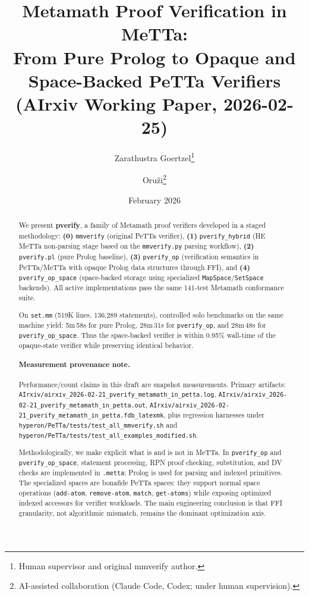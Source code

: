\documentclass[11pt]{article}
\title{Metamath Proof Verification in MeTTa:\\
From Pure Prolog to Opaque and Space-Backed PeTTa Verifiers\\[6pt]
\large (AIrxiv Working Paper, 2026-02-25)}
\author{
  Zarathustra Goertzel\thanks{Human supervisor and original mmverify author.}
  \and
  Oru\v{z}i\thanks{AI-assisted collaboration
    (Claude Code, Codex; under human supervision).}
}
\date{February 2026}
\begin{document}
\maketitle

\begin{abstract}
We present \textbf{pverify}, a family of Metamath proof verifiers
developed in a staged methodology:
\textbf{(0)} \texttt{mmverify} (original PeTTa verifier),
\textbf{(1)} \texttt{pverify\_hybrid}
(HE MeTTa non-parsing stage based on the
\texttt{mmverify.py} parsing workflow),
\textbf{(2)} \texttt{pverify.pl} (pure Prolog baseline),
\textbf{(3)} \texttt{pverify\_op}
(verification semantics in PeTTa/MeTTa with opaque Prolog data
structures through FFI),
and \textbf{(4)} \texttt{pverify\_op\_space}
(space-backed storage using specialized
\texttt{MapSpace}/\texttt{SetSpace} backends).
All active implementations pass the same 141-test Metamath
conformance suite.

On \texttt{set.mm} (519K lines, 136{,}289 statements), controlled
solo benchmarks on the same machine yield:
5m\,58s for pure Prolog,
28m\,31s for \texttt{pverify\_op},
and 28m\,48s for \texttt{pverify\_op\_space}.
Thus the space-backed verifier is within 0.95\% wall-time of the
opaque-state verifier while preserving identical behavior.

\paragraph{Measurement provenance note.}
Performance/count claims in this draft are snapshot measurements. Primary artifacts:
\texttt{AIrxiv/airxiv\_2026-02-21\_pverify\_metamath\_in\_petta.log},
\texttt{AIrxiv/airxiv\_2026-02-21\_pverify\_metamath\_in\_petta.out},
\texttt{AIrxiv/airxiv\_2026-02-21\_pverify\_metamath\_in\_petta.fdb\_latexmk},
plus regression harnesses under
\texttt{hyperon/PeTTa/tests/test\_all\_mmverify.sh} and
\texttt{hyperon/PeTTa/tests/test\_all\_examples\_modified.sh}.

Methodologically, we make explicit what is and is not in MeTTa.
In \texttt{pverify\_op} and \texttt{pverify\_op\_space},
statement processing, RPN proof checking, substitution, and DV checks
are implemented in \texttt{.metta}; Prolog is used for parsing and
indexed primitives.
The specialized spaces are bonafide PeTTa spaces:
they support normal space operations
(\texttt{add-atom}, \texttt{remove-atom}, \texttt{match},
\texttt{get-atoms}) while exposing optimized indexed accessors for
verifier workloads.
The main engineering conclusion is that FFI granularity, not
algorithmic mismatch, remains the dominant optimization axis.
\end{abstract}
\end{document}
